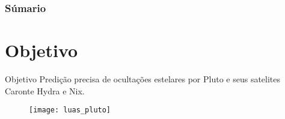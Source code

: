 \begin{frame}
\frametitle{Súmario} 
\tableofcontents
\end{frame}
\section{Objetivo} %

\label{sec:intro}

\begin{frame}[c]{}{}

	\begin{block}{Objetivo}
		Predição precisa de ocultações estelares por Pluto e seus satelites Caronte Hydra e Nix. 
	\end{block}

		\begin{figure}[tb]
		\centering
		\texttt{[image: luas\_pluto]}
		\label{fig:figure1}
\end{figure}




	
	
\end{frame}

